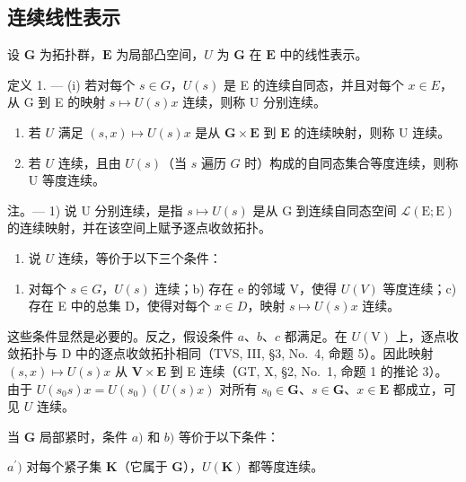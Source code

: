 \subsection{连续线性表示}

设 \(\mathbf{G}\) 为拓扑群，\(\mathbf{E}\) 为局部凸空间，\(U\) 为 \(\mathbf{G}\) 在 \(\mathbf{E}\) 中的线性表示。

定义 1. --- (i) 若对每个 \(s \in G\)，\(U(s)\) 是 E 的连续自同态，并且对每个 \(x \in E\)，从 G 到 E 的映射 \(s \mapsto U(s)x\) 连续，则称 U 分别连续。

\begin{enumerate}
\def\labelenumi{(\roman{enumi})}
\setcounter{enumi}{1}
\item
  若 \(U\) 满足 \((s,x)\mapsto U(s)x\) 是从 \(\mathbf{G}\times \mathbf{E}\) 到 \(\mathbf{E}\) 的连续映射，则称 U 连续。
\item
  若 \(U\) 连续，且由 \(U(s)\)（当 \(s\) 遍历 \(G\) 时）构成的自同态集合等度连续，则称 U 等度连续。
\end{enumerate}

注。--- 1) 说 U 分别连续，是指 \(s \mapsto U(s)\) 是从 G 到连续自同态空间 \(\mathcal{L}(\mathrm{E};\mathrm{E})\) 的连续映射，并在该空间上赋予逐点收敛拓扑。

\begin{enumerate}
\def\labelenumi{\arabic{enumi})}
\setcounter{enumi}{1}
\tightlist
\item
  说 \(U\) 连续，等价于以下三个条件：
\end{enumerate}

\begin{enumerate}
\def\labelenumi{\alph{enumi})}
\tightlist
\item
  对每个 \(s \in G\)，\(U(s)\) 连续；b) 存在 e 的邻域 V，使得 \(U(V)\) 等度连续；c) 存在 E 中的总集 D，使得对每个 \(x \in D\)，映射 \(s \mapsto U(s)x\) 连续。
\end{enumerate}

这些条件显然是必要的。反之，假设条件 \(a\)、\(b\)、\(c\) 都满足。在 \(U(\mathrm{V})\) 上，逐点收敛拓扑与 D 中的逐点收敛拓扑相同（TVS, III, §3, No.~4, 命题 5）。因此映射 \((s,x)\mapsto U(s)x\) 从 \(\mathbf{V}\times \mathbf{E}\) 到 E 连续（GT, X, §2, No.~1, 命题 1 的推论 3）。由于 \(U(s_0s)x = U(s_0)(U(s)x)\) 对所有 \(s_0\in \mathbf{G}\)、\(s\in \mathbf{G}\)、\(x\in \mathbf{E}\) 都成立，可见 \(U\) 连续。

当 \(\mathbf{G}\) 局部紧时，条件 \(a)\) 和 \(b)\) 等价于以下条件：

\(a^{\prime})\) 对每个紧子集 \(\mathbf{K}\)（它属于 \(\mathbf{G}\)），\(U(\mathbf{K})\) 都等度连续。

